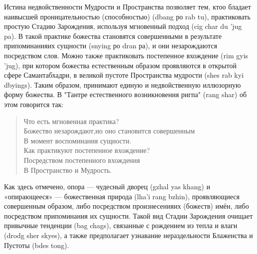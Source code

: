 \newpage
{}
\Vspace{1cm}
Истина недвойственности Мудрости и Пространства позволяет тем, ктоо бладает
наивысшей проницательностью (способно\-стью) (dbang ро rab tu), практиковать простую
Стадию Зарож\-дения, используя мгновенный подход (cig char du 'jug pa). В такой практике
божества становятся совершенными в резуль\-тате припоминанияих сущности (snying ро dran
ра), и они незарождаются посредством слов. Можно также практиковать постепенное
вхождение (rim gyis 'jug), при котором божества естественным образом проявляются в
открытой сфере Саманта\-бхадри, в великой пустоте Пространства мудрости (shes rab kyi
dbyings). Таким образом, принимают единую и недвойственную иллюзорную форму
божества. В "Тантре естественного возник\-новения ригпа" (rang shar) об этом говорится так:

\begin{verse}
Что есть мгновенная практика?\\
Божество незарождают,но оно становится совершенным\\
В момент воспоминания сущности.\\
Как практикуют постепенное вхождение?\\
Посредством постепенного вхождения\\
В Пространство и Мудрость.\\
\end{verse}

Как здесь отмечено, опора — чудесный дворец (gzhal yas khang) и «опирающееся» —
божественная природа (lha'i rang bzhin), проявляющиеся совершенным
образом, либо посред\-ством произнесенияих (божеств) имён, либо посредством
при\-поминания их сущности. Такой вид Стадии Зарождения очища\-ет привычные тенденции
(bag chags), связанные с рождением из тепла и влаги (drodg sher skyes), а также
предполагает узнавание нераздельности Блаженства и Пустоты (bdes tong).


